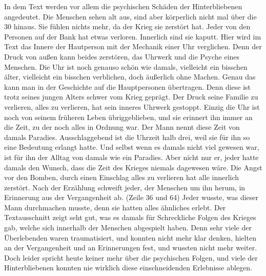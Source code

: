 In dem Text werden vor allem die psychischen Schäden der Hinterbliebenen angedeutet. Die Menschen sehen alt aus, sind aber körperlich nicht mal über die 30 hinaus. Sie fühlen nichts mehr, da der Krieg sie zerstört hat. Jeder von den Personen auf der Bank hat etwas verloren. Innerlich sind sie kaputt. Hier wird im Text das Innere der Hautperson mit der Mechanik einer Uhr verglichen. Denn der Druck von außen kann beides zerstören, das Uhrwerk und die Psyche eines Menschen. Die Uhr ist noch genauso schön wie damals, vielleicht ein bisschen älter, vielleicht ein bisschen verblichen, doch äußerlich ohne Machen. Genau das kann man in der Geschichte auf die Hauptpersonen übertragen. Denn diese ist trotz seines jungen Alters schwer vom Krieg geprägt. Der Druck seine Familie zu verlieren, alles zu verlieren, hat sein inneres Uhrwerk gestoppt. Einzig die Uhr ist noch von seinem früheren Leben übriggeblieben, und sie erinnert ihn immer an die Zeit, zu der noch alles in Ordnung war. Der Mann nennt diese Zeit von damals Paradies. Ausschlaggebend ist die Uhrzeit halb drei, weil sie für ihn so eine Bedeutung erlangt hatte. Und selbst wenn es damals nicht viel gewesen war, ist für ihn der Alltag von damals wie ein Paradies. Aber nicht nur er, jeder hatte damals den Wunsch, dass die Zeit des Krieges niemals dagewesen wäre. Die Angst vor den Bomben, durch einen Einschlag alles zu verlieren hat alle innerlich zerstört. Nach der Erzählung schweift jeder, der Menschen um ihn herum, in Erinnerung aus der Vergangenheit ab. (Zeile 36 und 64) Jeder wusste, was dieser Mann durchmachen musste, denn sie hatten alles ähnliches erlebt. Der Textausschnitt zeigt seht gut, was es damals für Schreckliche Folgen des Krieges gab, welche sich innerhalb der Menschen abgespielt haben. Denn sehr viele der Überlebenden waren traumatisiert, und konnten nicht mehr klar denken, hielten an der Vergangenheit und an Erinnerungen fest, und wussten nicht mehr weiter. Doch leider spricht heute keiner mehr über die psychischen Folgen, und viele der Hinterbliebenen konnten nie wirklich diese einschneidenden Erlebnisse ablegen.  
\newpage


